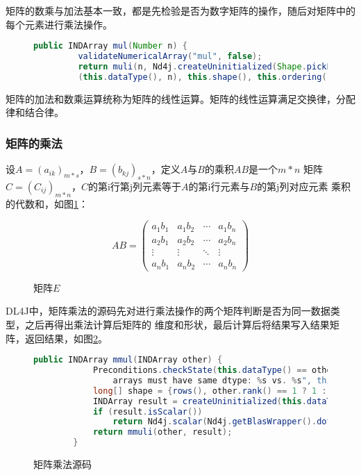 矩阵的数乘与加法基本一致，都是先检验是否为数字矩阵的操作，随后对矩阵中的每个元素进行乘法操作。


\begin{figure}[!ht]
	\begin{lstlisting}[language=Java]
	  public INDArray mul(Number n) {
	     validateNumericalArray("mul", false);
		 return muli(n, Nd4j.createUninitialized(Shape.pickPairwiseDataType
		 (this.dataType(), n), this.shape(), this.ordering()));}
	\end{lstlisting}
	\end{figure}

矩阵的加法和数乘运算统称为矩阵的线性运算。矩阵的线性运算满足交换律，分配律和结合律。

\subsubsection{矩阵的乘法}

设$A=(a_{ik})_{m*s}$，$B=(b_{kj})_{s*n}$，定义$A$与$B$的乘积$AB$是一个$m*n$
矩阵$C=(C_{ij})_{m*n}$，$C$的第i行第j列元素等于$A$的第i行元素与$B$的第j列对应元素
乘积的代数和，如图\ref{matrix_e}：

\begin{figure}[!ht]
	\begin{equation*}
		AB=
		\left( \begin{matrix}
			a_{1}b_{1} & a_{1}b_{2} & \cdots & a_{1}b_{n}\\
			a_{2}b_{1} & a_{2}b_{2} & \cdots & a_{2}b_{n}\\
			\vdots & \vdots & \ddots & \vdots\\
			a_{n}b_{1} & a_{n}b_{2} & \cdots & a_{n}b_{n}
			\end{matrix}
			\right )
	\end{equation*}
	\caption{矩阵$E$}
	\label{matrix_e}
\end{figure}

DL4J中，矩阵乘法的源码先对进行乘法操作的两个矩阵判断是否为同一数据类型，之后再得出乘法计算后矩阵的
维度和形状，最后计算后将结果写入结果矩阵，返回结果，如图\ref{matrix_multiply_code}。


\begin{figure}[!ht]
	\begin{lstlisting}[language=Java]
		public INDArray mmul(INDArray other) {
			Preconditions.checkState(this.dataType() == other.dataType(), "Matrix multiplication: 
			    arrays must have same dtype: %s vs. %s", this.dataType(), other.dataType());
			long[] shape = {rows(), other.rank() == 1 ? 1 : other.columns()};
			INDArray result = createUninitialized(this.dataType(), shape, 'f');
			if (result.isScalar())
				return Nd4j.scalar(Nd4j.getBlasWrapper().dot(this, other)).reshape(1, 1);
			return mmuli(other, result);
		}
	\end{lstlisting}
	\caption{矩阵乘法源码}
	\label{matrix_multiply_code}
	\end{figure}


